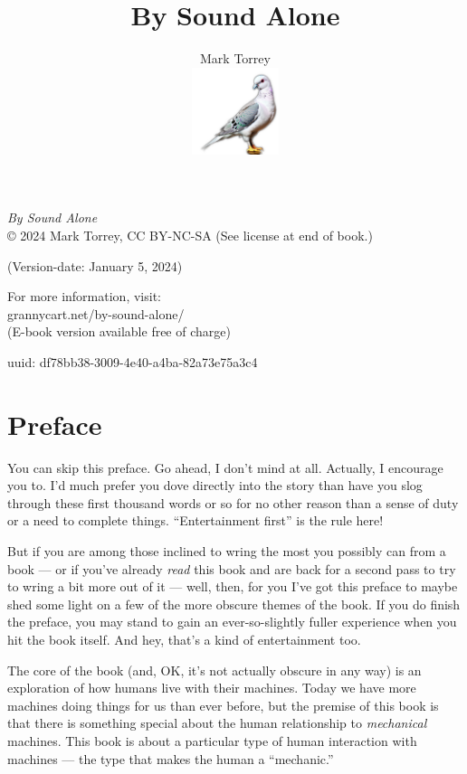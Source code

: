 \documentclass[
]{scrbook}
\title{By Sound Alone}
\author{Mark Torrey\\[5mm] \includegraphics[width=1in]{../cover/pigeon-logo.png}}
\date{}
\begin{document}
\frontmatter
\maketitle

\small
\clearpage
\emph{By Sound Alone}\\
© 2024 Mark Torrey, CC BY-NC-SA (See license at end of book.)

(Version-date: January 5, 2024)

For more information, visit:\\
grannycart.net/by-sound-alone/\\
(E-book version available free of charge)

uuid: df78bb38-3009-4e40-a4ba-82a73e75a3c4
\clearpage

\mainmatter
\newpage

\hypertarget{preface}{%
\section{Preface}\label{preface}}

You can skip this preface. Go ahead, I don't mind at all. Actually, I
encourage you to. I'd much prefer you dove directly into the story than
have you slog through these first thousand words or so for no other
reason than a sense of duty or a need to complete things.
``Entertainment first'' is the rule here!

But if you are among those inclined to wring the most you possibly can
from a book --- or if you've already \emph{read} this book and are back
for a second pass to try to wring a bit more out of it --- well, then,
for you I've got this preface to maybe shed some light on a few of the
more obscure themes of the book. If you do finish the preface, you may
stand to gain an ever-so-slightly fuller experience when you hit the
book itself. And hey, that's a kind of entertainment too.

The core of the book (and, OK, it's not actually obscure in any way) is
an exploration of how humans live with their machines. Today we have
more machines doing things for us than ever before, but the premise of
this book is that there is something special about the human
relationship to \emph{mechanical} machines. This book is about a
particular type of human interaction with machines --- the type that
makes the human a ``mechanic.''
\end{document}
